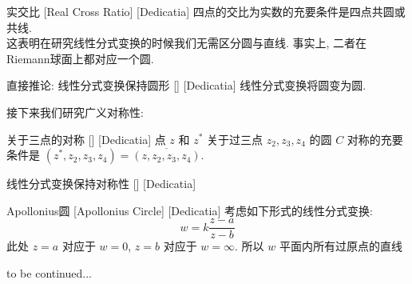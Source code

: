 \documentclass[UTF8]{ctexart}
\newcommand{\continued}{{\Large to be continued...}}
\begin{document}
\begin{ppt}
    [UUID]
    {实交比}
    [Real Cross Ratio]
    [Dedicatia]
    四点的交比为实数的充要条件是四点共圆或共线. \\
    这表明在研究线性分式变换的时候我们无需区分圆与直线. 事实上, 二者在Riemann球面上都对应一个圆. 
\end{ppt}
\begin{ppt}
    [UUID]
    {直接推论: 线性分式变换保持圆形}
    []
    [Dedicatia]
    线性分式变换将圆变为圆. 
\end{ppt}
接下来我们研究广义对称性: 
\begin{ppt}
    [UUID]
    {关于三点的对称}
    []
    [Dedicatia]
    点 \( z \) 和 \( z^* \) 关于过三点 \( z_2,z_3,z_4 \) 的圆 \( C \) 对称的充要条件是 \( (z^*,z_2,z_3,z_4)=\overline{(z,z_2,z_3,z_4)} \).
\end{ppt}
\begin{ppt}
    [UUID]
    {线性分式变换保持对称性}
    []
    [Dedicatia]
\end{ppt}
\begin{dfn}
    [UUID]
    {Apollonius圆}
    [Apollonius Circle]
    [Dedicatia]
    考虑如下形式的线性分式变换: 
    \[w=k\frac{z-a}{z-b}\]
    此处 \( z=a \) 对应于 \( w=0 \),  \( z=b \) 对应于 \( w=\infty \). 所以 \( w \) 平面内所有过原点的直线
\end{dfn}
\continued
\end{document}
